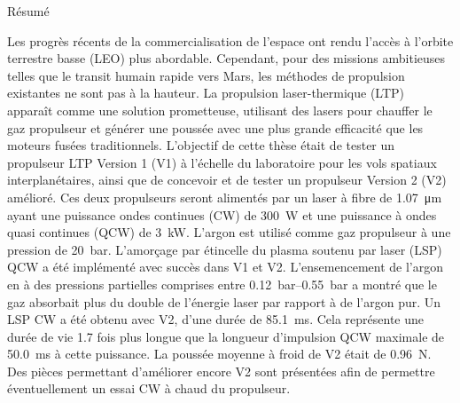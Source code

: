 
\begin{plainchp}{Résumé}

    Les progrès récents de la commercialisation de l'espace ont rendu l'accès à l'orbite terrestre basse (LEO) plus abordable. Cependant, pour des missions ambitieuses telles que le transit humain rapide vers Mars, les méthodes de propulsion existantes ne sont pas à la hauteur. La propulsion laser-thermique (LTP) apparaît comme une solution prometteuse, utilisant des lasers pour chauffer le gaz propulseur et générer une poussée avec une plus grande efficacité que les moteurs fusées traditionnels. L'objectif de cette thèse était de tester un propulseur LTP Version 1 (V1) à l'échelle du laboratoire pour les vols spatiaux interplanétaires, ainsi que de concevoir et de tester un propulseur Version 2 (V2) amélioré. Ces deux propulseurs seront alimentés par un laser à fibre de \qty{1.07}{μm} ayant une puissance ondes continues (CW) de \qty{300}{W} et une puissance à ondes quasi continues (QCW) de \qty{3}{kW}. L'argon est utilisé comme gaz propulseur à une pression de \qty{20}{bar}. L'amorçage par étincelle du plasma soutenu par laser (LSP) QCW a été implémenté avec succès dans V1 et V2. L'ensemencement de l'argon en  à des pressions partielles comprises entre \qtyrange{.12}{.55}{bar} a montré que le gaz absorbait plus du double de l'énergie laser par rapport à de l'argon pur. Un LSP CW a été obtenu avec V2, d'une durée de \qty{85.1}{ms}. Cela représente une durée de vie 1.7 fois plus longue que la longueur d'impulsion QCW maximale de \qty{50.0}{ms} à cette puissance. La poussée moyenne à froid de V2 était de \qty{0.96}{N}. Des pièces permettant d'améliorer encore V2 sont présentées afin de permettre éventuellement un essai CW à chaud du propulseur.
    
\end{plainchp}